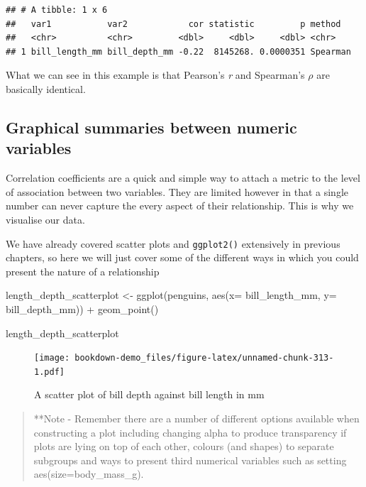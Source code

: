 \documentclass[
]{book}
\newenvironment{Shaded}{\begin{snugshade}}{\end{snugshade}}
\newcommand{\AttributeTok}[1]{\textcolor[rgb]{0.77,0.63,0.00}{#1}}
\newcommand{\FunctionTok}[1]{\textcolor[rgb]{0.00,0.00,0.00}{#1}}
\newcommand{\NormalTok}[1]{#1}
\newcommand{\OtherTok}[1]{\textcolor[rgb]{0.56,0.35,0.01}{#1}}
\newcommand{\SpecialCharTok}[1]{\textcolor[rgb]{0.00,0.00,0.00}{#1}}
\begin{document}
\begin{verbatim}
## # A tibble: 1 x 6
##   var1           var2            cor statistic         p method  
##   <chr>          <chr>         <dbl>     <dbl>     <dbl> <chr>   
## 1 bill_length_mm bill_depth_mm -0.22  8145268. 0.0000351 Spearman
\end{verbatim}

What we can see in this example is that Pearson's \emph{r} and Spearman's \(\rho\) are basically identical.

\hypertarget{graphical-summaries-between-numeric-variables}{%
\subsection{Graphical summaries between numeric variables}\label{graphical-summaries-between-numeric-variables}}

Correlation coefficients are a quick and simple way to attach a metric to the level of association between two variables. They are limited however in that a single number can never capture the every aspect of their relationship. This is why we visualise our data.

We have already covered scatter plots and \texttt{ggplot2()} extensively in previous chapters, so here we will just cover some of the different ways in which you could present the nature of a relationship

\begin{Shaded}
\begin{Highlighting}[]
\NormalTok{length\_depth\_scatterplot }\OtherTok{\textless{}{-}} \FunctionTok{ggplot}\NormalTok{(penguins, }\FunctionTok{aes}\NormalTok{(}\AttributeTok{x=}\NormalTok{ bill\_length\_mm, }
                     \AttributeTok{y=}\NormalTok{ bill\_depth\_mm)) }\SpecialCharTok{+}
    \FunctionTok{geom\_point}\NormalTok{()}

\NormalTok{length\_depth\_scatterplot}
\end{Highlighting}
\end{Shaded}

\begin{figure}
\centering
\texttt{[image: bookdown-demo\_files/figure-latex/unnamed-chunk-313-1.pdf]}
\caption{\label{fig:unnamed-chunk-313}A scatter plot of bill depth against bill length in mm}
\end{figure}

\begin{quote}
**Note - Remember there are a number of different options available when constructing a plot including changing alpha to produce transparency if plots are lying on top of each other, colours (and shapes) to separate subgroups and ways to present third numerical variables such as setting aes(size=body\_mass\_g).
\end{quote}
\end{document}
